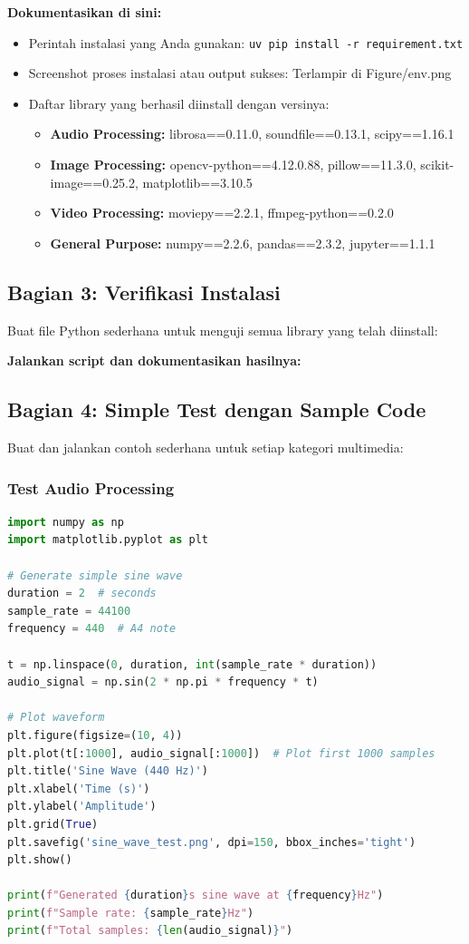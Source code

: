 \documentclass[11pt,a4paper]{article}
\begin{document}
\textbf{Dokumentasikan di sini:}
\begin{itemize}
    \item Perintah instalasi yang Anda gunakan: \texttt{uv pip install -r requirement.txt}
    \item Screenshot proses instalasi atau output sukses: Terlampir di Figure/env.png
    \item Daftar library yang berhasil diinstall dengan versinya:
    \begin{itemize}
        \item \textbf{Audio Processing:} librosa==0.11.0, soundfile==0.13.1, scipy==1.16.1
        \item \textbf{Image Processing:} opencv-python==4.12.0.88, pillow==11.3.0, scikit-image==0.25.2, matplotlib==3.10.5
        \item \textbf{Video Processing:} moviepy==2.2.1, ffmpeg-python==0.2.0
        \item \textbf{General Purpose:} numpy==2.2.6, pandas==2.3.2, jupyter==1.1.1
    \end{itemize}
\end{itemize}

\subsection{Bagian 3: Verifikasi Instalasi}
Buat file Python sederhana untuk menguji semua library yang telah diinstall:


\textbf{Jalankan script dan dokumentasikan hasilnya:}

\subsection{Bagian 4: Simple Test dengan Sample Code}
Buat dan jalankan contoh sederhana untuk setiap kategori multimedia:

\subsubsection{Test Audio Processing}
\begin{lstlisting}[language=Python, caption=Test audio processing sederhana]
import numpy as np
import matplotlib.pyplot as plt

# Generate simple sine wave
duration = 2  # seconds
sample_rate = 44100
frequency = 440  # A4 note

t = np.linspace(0, duration, int(sample_rate * duration))
audio_signal = np.sin(2 * np.pi * frequency * t)

# Plot waveform
plt.figure(figsize=(10, 4))
plt.plot(t[:1000], audio_signal[:1000])  # Plot first 1000 samples
plt.title('Sine Wave (440 Hz)')
plt.xlabel('Time (s)')
plt.ylabel('Amplitude')
plt.grid(True)
plt.savefig('sine_wave_test.png', dpi=150, bbox_inches='tight')
plt.show()

print(f"Generated {duration}s sine wave at {frequency}Hz")
print(f"Sample rate: {sample_rate}Hz")
print(f"Total samples: {len(audio_signal)}")
\end{lstlisting}
\end{document}
